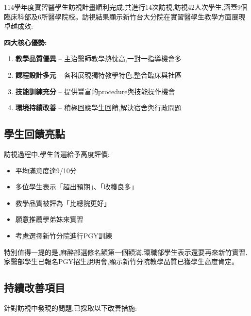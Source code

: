 \documentclass[12pt,a4paper]{article}
\begin{document}
114學年度實習醫學生訪視計畫順利完成,共進行14次訪視,訪視42人次學生,涵蓋9個臨床科部及6所醫學院校。訪視結果顯示新竹台大分院在實習醫學生教學方面展現卓越成效:

\begin{importantbox}
\textbf{四大核心優勢:}
\begin{enumerate}[leftmargin=*]
\item \textbf{教學品質優異} -- 主治醫師教學熱忱高,一對一指導機會多
\item \textbf{課程設計多元} -- 各科展現獨特教學特色,整合臨床與社區
\item \textbf{技能訓練充分} -- 提供豐富的procedure與技能操作機會
\item \textbf{環境持續改善} -- 積極回應學生回饋,解決宿舍與行政問題
\end{enumerate}
\end{importantbox}

\subsection{學生回饋亮點}

訪視過程中,學生普遍給予高度評價:

\begin{itemize}[leftmargin=*]
\item 平均滿意度達9/10分
\item 多位學生表示「超出預期」、「收穫良多」
\item 教學品質被評為「比總院更好」
\item 願意推薦學弟妹來實習
\item 考慮選擇新竹分院進行PGY訓練
\end{itemize}

特別值得一提的是,麻醉部選修名額第一個額滿,環職部學生表示還要再來新竹實習,家醫部學生已報名PGY招生說明會,顯示新竹分院教學品質已獲學生高度肯定。

\subsection{持續改善項目}

針對訪視中發現的問題,已採取以下改善措施:
\end{document}
